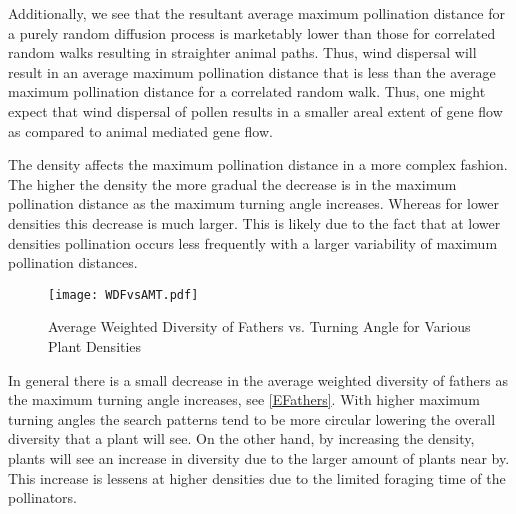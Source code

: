Additionally, we see that the resultant average maximum pollination distance for a purely random
diffusion process is marketably lower than those for correlated random walks resulting in straighter
animal paths. Thus, wind dispersal will result in an average maximum pollination distance that is
less than the average maximum pollination distance for a correlated random walk. Thus, one might
expect that wind dispersal of pollen results in a smaller areal extent of gene flow as compared to
animal mediated gene flow.

The density affects the maximum pollination distance in a more complex fashion.  The higher the
density the more gradual the decrease is in the maximum pollination distance as the maximum turning
angle increases.  Whereas for lower densities this decrease is much larger.  This is likely due to
the fact that at lower densities pollination occurs less frequently with a larger variability of
maximum pollination distances.

\begin{figure}
  \begin{center}
  \texttt{[image: WDFvsAMT.pdf]}
  \end{center}
  \caption{\small Average Weighted Diversity of Fathers vs. Turning Angle for Various Plant Densities}
  \label{EFathers}
\end{figure}

In general there is a small decrease in the average weighted diversity of fathers as the maximum
turning angle increases, see \autoref{EFathers}. With higher maximum turning angles the search
patterns tend to be more circular lowering the overall diversity that a plant will see.  On the
other hand, by increasing the density, plants will see an increase in diversity due to the larger
amount of plants near by.  This increase is lessens at higher densities due to the limited foraging
time of the pollinators.
